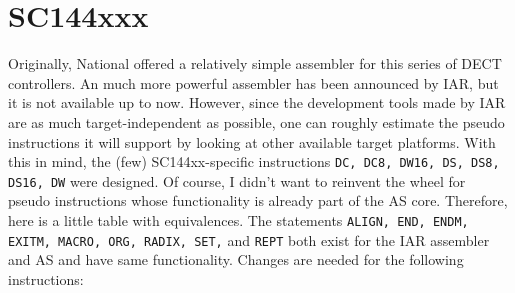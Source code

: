 \documentclass[12pt,twoside]{report}
\newcommand{\tty}[1]{{\tt #1}}
\begin{document}

\section{SC144xxx}
\label{SC144xxspec}

Originally, National offered a relatively simple assembler for this series
of DECT controllers.  An much more powerful assembler has been announced
by IAR, but it is not available up to now.  However, since the development
tools made by IAR are as much target-independent as possible, one can
roughly estimate the pseudo instructions it will support by looking at
other available target platforms.  With this in mind, the (few)
SC144xx-specific instructions {\tt DC, DC8, DW16, DS, DS8, DS16, DW} were
designed.  Of course, I didn't want to reinvent the wheel for pseudo
instructions whose functionality is already part of the AS core.
Therefore, here is a little table with equivalences.  The statements
\tty{ALIGN, END, ENDM, EXITM, MACRO, ORG, RADIX, SET,} and \tty{REPT} both
exist for the IAR assembler and AS and have same functionality.  Changes
are needed for the following instructions:
\end{document}
